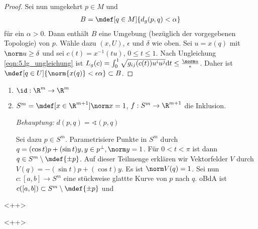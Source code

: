 \begin{stz}
\begin{proof}
    Sei nun umgekehrt $p\in M$ und
    \begin{align}
      B = \mdef[q\in M]{d_g(p,q) < \alpha}
      \label{}
    \end{align}
    für ein $\alpha > 0$. Dann enthält $B$ eine Umgebung (bezüglich der
    vorgegebenen Topologie) von $p$. Wähle dazu $(x, U)$, $\epsilon$ und
    $\delta$ wie oben. Sei $u = x(q)$ mit $\norm u \ge \delta$ und sei $c(t) =
    x^{-1}(tu)$, $0 \le t \le 1$. Nach Ungleichung \ref{eqn:5.lg_ungleichung}
    ist $L_g(c) = \int_0^1 \sqrt{g_{ij}(c(t))u^iu^j}\d t \le
    \frac{\norm u}{\epsilon}$. Daher ist $\mdef[q\in U]{\norm{x(q)} <
    \epsilon\alpha} \subset B$.
  \end{proof}

  \begin{bsps}
    \begin{enumerate}
      \item $\id : \R^m \to \R^m$
      \item $S^m = \mdef[x\in \R^{m+1}]{\norm x = 1}$, $f : S^m\to\R^{m+1}$ die
        Inklusion.
        
        \emph{Behauptung:} $d(p,q) = \sphericalangle(p,q)$

        Sei dazu $p\in S^m$. Parametrisiere Punkte in $S^m$ durch $q = (\cos t)p
        + (\sin t)y, y\in p^\perp, \norm y = 1$. Für $0< t < \pi$ ist dann $q\in
        S^m \setminus \mdef{\pm p}$. Auf dieser Teilmenge erklären wir
        Vektorfelder $V$ durch $V(q) = -(\sin t)p + (\cos t)y$. Es ist $\norm
        V(q) = 1$. Sei nun $c:[a,b] \to S^m$ eine stückweise glattte Kurve von
        $p$ nach $q$.
        oBdA ist $c([a,b])\subset S^m\setminus\mdef{\pm p}$ und 
    \end{enumerate}<++>
  \end{bsps}<++>
\end{stz}
